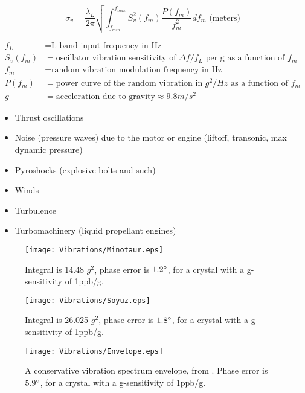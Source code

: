 \begin{equation}
\sigma_v = \frac{\lambda_L}{2\pi}\sqrt{\int_{f_{min}}^{f_{max}} S^2_v(f_m) \frac{P(f_m)}{f^2_m} df_m}\text{ (meters)}
\end{equation}

\begin{align*}
f_L &= \text{L-band input frequency in Hz} \\
S_v(f_m) &= \text{oscillator vibration sensitivity of } \Delta f/f_L \text{ per g as a function of } f_m \\
f_m &= \text{random vibration modulation frequency in Hz} \\
P(f_m) &= \text{power curve of the random vibration in }g^2/Hz \text{ as a function of } f_m \\
g &= \text{acceleration due to gravity} \approx 9.8 m/s^2
\end{align*}



\begin{itemize}
\item{Thrust oscillations\cite{NASAVibrations}}
\item{Noise (pressure waves) due to the motor or
engine (liftoff, transonic, max dynamic pressure)\cite{NASAVibrations}}
\item{Pyroshocks (explosive bolts and such)\cite{HarveyMudd}}
\item{Winds\cite{HarveyMudd}}
\item{Turbulence\cite{HarveyMudd}}
\item{Turbomachinery (liquid propellant engines)\cite{HarveyMudd}}
\end{itemize}

\begin{figure}[!htb] 
    \centering
    \texttt{[image: Vibrations/Minotaur.eps]} 
    \caption{Integral is 14.48 $g^2$, phase error is $1.2\degree$, for a crystal with a g-sensitivity of  1ppb/g.}
    \label{fig:MinotaurVibrations}
\end{figure}


\begin{figure}[!htb] 
    \centering
    \texttt{[image: Vibrations/Soyuz.eps]} 
    \caption{Integral is 26.025 $g^2$, phase error is $1.8\degree$, for a crystal with a g-sensitivity of  1ppb/g.}
    \label{fig:SoyuzVibrations}
\end{figure}

\begin{figure}[!htb] 
    \centering
    \texttt{[image: Vibrations/Envelope.eps]} 
    \caption{A conservative vibration spectrum envelope, from \cite{VibrationHandout}. Phase error is $5.9\degree$, for a crystal with a g-sensitivity of  1ppb/g.}
    \label{fig:ConservativeVibrations}
\end{figure}



